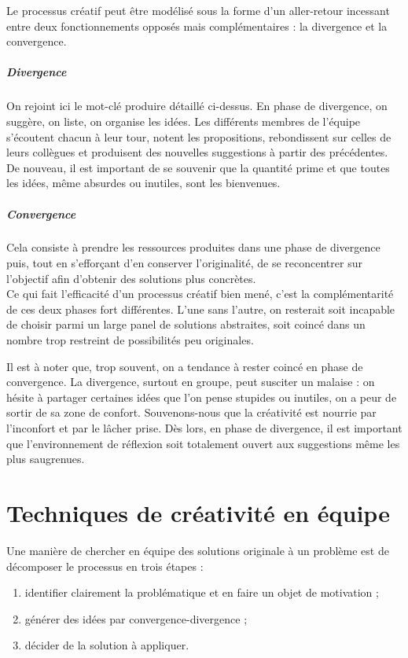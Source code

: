 \documentclass[a4paper,12pt, oneside]{article}
\begin{document}
Le processus créatif peut être modélisé sous la forme d'un aller-retour incessant entre deux fonctionnements opposés mais complémentaires : la divergence et la convergence.

\subparagraph{Divergence} On rejoint ici le mot-clé \og{}produire\fg{} détaillé ci-dessus. En phase de divergence, on suggère, on liste, on organise les idées. Les différents membres de l'équipe s'écoutent chacun à leur tour, notent les propositions, rebondissent sur celles de leurs collègues et produisent des nouvelles suggestions à partir des précédentes. De nouveau, il est important de se souvenir que la quantité prime et que toutes les idées, même absurdes ou inutiles, sont les bienvenues.
\subparagraph{Convergence} Cela consiste à prendre les ressources produites dans une phase de divergence puis, tout en s'efforçant d'en conserver l'originalité, de se reconcentrer sur l'objectif afin d'obtenir des solutions plus concrètes.\\[0.4em]

Ce qui fait l'efficacité d'un processus créatif bien mené, c'est la complémentarité de ces deux phases fort différentes. L'une sans l'autre, on resterait soit incapable de choisir parmi un large panel de solutions abstraites, soit coincé dans un nombre trop restreint de possibilités peu originales.

Il est à noter que, trop souvent, on a tendance à rester coincé en phase de convergence. La divergence, surtout en groupe, peut susciter un malaise : on hésite à partager certaines idées que l'on pense stupides ou inutiles, on a peur de sortir de sa zone de confort. Souvenons-nous que la créativité est nourrie par l'inconfort et par le lâcher prise. Dès lors, en phase de divergence, il est important que l'environnement de réflexion soit totalement ouvert aux suggestions même les plus saugrenues.

\section{Techniques de créativité en équipe}

Une manière de chercher en équipe des solutions originale à un problème est de décomposer le processus en trois étapes :

\begin{enumerate}
    \item identifier clairement la problématique et en faire un objet de motivation ;
    \item générer des idées par convergence-divergence ;
    \item décider de la solution à appliquer.
\end{enumerate}
\end{document}
